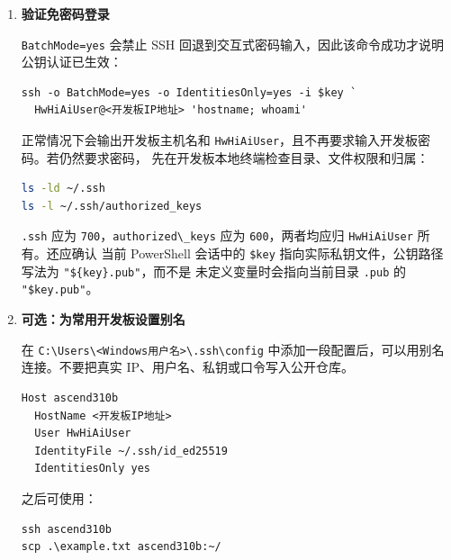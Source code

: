 \begin{enumerate}
\begin{lstlisting}
Get-Content -Raw -LiteralPath "${key}.pub" | ssh HwHiAiUser@<开发板IP地址> `
  'umask 077; mkdir -p ~/.ssh; cat >> ~/.ssh/authorized_keys; chmod 700 ~/.ssh; chmod 600 ~/.ssh/authorized_keys'
\end{lstlisting}

  对同一把密钥只需执行一次。若误重复执行，只会在
  \passthrough{\lstinline!authorized\_keys!} 中留下重复的同一公钥，
  不会生成新的访问权限；可在开发板上人工去重，但不要修改其他用户的条目。
\item
  \textbf{验证免密码登录}

  \passthrough{\lstinline!BatchMode=yes!} 会禁止 SSH
  回退到交互式密码输入，因此该命令成功才说明公钥认证已生效：

\begin{lstlisting}
ssh -o BatchMode=yes -o IdentitiesOnly=yes -i $key `
  HwHiAiUser@<开发板IP地址> 'hostname; whoami'
\end{lstlisting}

  正常情况下会输出开发板主机名和
  \passthrough{\lstinline!HwHiAiUser!}，且不再要求输入开发板密码。若仍然要求密码，
  先在开发板本地终端检查目录、文件权限和归属：

\begin{lstlisting}[language=bash]
ls -ld ~/.ssh
ls -l ~/.ssh/authorized_keys
\end{lstlisting}

  \passthrough{\lstinline!.ssh!} 应为
  \passthrough{\lstinline!700!}，\passthrough{\lstinline!authorized\_keys!}
  应为 \passthrough{\lstinline!600!}，两者均应归
  \passthrough{\lstinline!HwHiAiUser!} 所有。还应确认 当前 PowerShell
  会话中的 \passthrough{\lstinline!$key!}
  指向实际私钥文件，公钥路径写法为
  \passthrough{\lstinline!"$\{key\}.pub"!}，而不是
  未定义变量时会指向当前目录 \passthrough{\lstinline!.pub!} 的
  \passthrough{\lstinline!"$key.pub"!}。
\item
  \textbf{可选：为常用开发板设置别名}

  在 \passthrough{\lstinline!C:\\Users\\<Windows用户名>\\.ssh\\config!}
  中添加一段配置后，可以用别名连接。不要把真实
  IP、用户名、私钥或口令写入公开仓库。

\begin{lstlisting}
Host ascend310b
  HostName <开发板IP地址>
  User HwHiAiUser
  IdentityFile ~/.ssh/id_ed25519
  IdentitiesOnly yes
\end{lstlisting}

  之后可使用：

\begin{lstlisting}
ssh ascend310b
scp .\example.txt ascend310b:~/
\end{lstlisting}
\end{enumerate}

